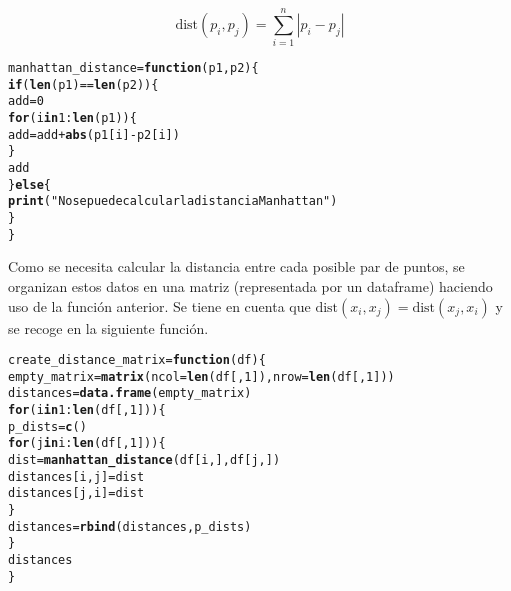 \documentclass[12pt]{report}\usepackage[]{graphicx}\usepackage[dvipsnames]{xcolor}
\makeatletter
\newcommand{\hlnum}[1]{\textcolor[rgb]{0.686,0.059,0.569}{#1}}%
\newcommand{\hlstr}[1]{\textcolor[rgb]{0.192,0.494,0.8}{#1}}%
\newcommand{\hlopt}[1]{\textcolor[rgb]{0,0,0}{#1}}%
\newcommand{\hlstd}[1]{\textcolor[rgb]{0.345,0.345,0.345}{#1}}%
\newcommand{\hlkwa}[1]{\textcolor[rgb]{0.161,0.373,0.58}{\textbf{#1}}}%
\newcommand{\hlkwb}[1]{\textcolor[rgb]{0.69,0.353,0.396}{#1}}%
\newcommand{\hlkwc}[1]{\textcolor[rgb]{0.333,0.667,0.333}{#1}}%
\newcommand{\hlkwd}[1]{\textcolor[rgb]{0.737,0.353,0.396}{\textbf{#1}}}%
\newenvironment{kframe}{%
 \def\at@end@of@kframe{}%
 \ifinner\ifhmode%
  \def\at@end@of@kframe{\end{minipage}}%
  \begin{minipage}{\columnwidth}%
 \fi\fi%
 \def\FrameCommand##1{\hskip\@totalleftmargin \hskip-\fboxsep
 \colorbox{shadecolor}{##1}\hskip-\fboxsep
     \hskip-\linewidth \hskip-\@totalleftmargin \hskip\columnwidth}%
 \MakeFramed {\advance\hsize-\width
   \@totalleftmargin\z@ \linewidth\hsize
   \@setminipage}}%
 {\par\unskip\endMakeFramed%
 \at@end@of@kframe}
\newenvironment{knitrout}{}{} %
\newcommand{\dt}{\text{dist}}
\makeatother
\begin{document}
						$$
						\dt(p_i, p_j) = \sum_{i=1}^n |p_i-p_j|
						$$
						
\begin{knitrout}
\color{fgcolor}\begin{kframe}
\begin{alltt}
\hlstd{manhattan_distance} \hlkwb{=} \hlkwa{function}\hlstd{(}\hlkwc{p1}\hlstd{,} \hlkwc{p2}\hlstd{) \{}
        \hlkwa{if}\hlstd{(}\hlkwd{len}\hlstd{(p1)} \hlopt{==} \hlkwd{len}\hlstd{(p2))\{}
                \hlstd{add} \hlkwb{=} \hlnum{0}
                \hlkwa{for}\hlstd{(i} \hlkwa{in} \hlnum{1}\hlopt{:}\hlkwd{len}\hlstd{(p1)) \{}
                        \hlstd{add} \hlkwb{=} \hlstd{add} \hlopt{+} \hlkwd{abs}\hlstd{(p1[i]} \hlopt{-} \hlstd{p2[i])}
                \hlstd{\}}
                \hlstd{add}
        \hlstd{\}} \hlkwa{else} \hlstd{\{}
                \hlkwd{print}\hlstd{(}\hlstr{"No se puede calcular la distancia Manhattan"}\hlstd{)}
        \hlstd{\}}
\hlstd{\}}
\end{alltt}
\end{kframe}
\end{knitrout}
						
						Como se necesita calcular la distancia entre cada posible par de puntos, se organizan estos datos en una matriz (representada por un dataframe) haciendo uso de la función anterior. Se tiene en cuenta que $\dt(x_i, x_j) = \dt(x_j, x_i)$ y se recoge en la siguiente función. 
						
\begin{knitrout}
\color{fgcolor}\begin{kframe}
\begin{alltt}
\hlstd{create_distance_matrix} \hlkwb{=} \hlkwa{function}\hlstd{(}\hlkwc{df}\hlstd{) \{}
        \hlstd{empty_matrix} \hlkwb{=} \hlkwd{matrix}\hlstd{(}\hlkwc{ncol} \hlstd{=} \hlkwd{len}\hlstd{(df[,}\hlnum{1}\hlstd{]),} \hlkwc{nrow} \hlstd{=} \hlkwd{len}\hlstd{(df[,}\hlnum{1}\hlstd{]))}
        \hlstd{distances} \hlkwb{=} \hlkwd{data.frame}\hlstd{(empty_matrix)}
        \hlkwa{for} \hlstd{(i} \hlkwa{in} \hlnum{1}\hlopt{:}\hlkwd{len}\hlstd{(df[,}\hlnum{1}\hlstd{])) \{}
                \hlstd{p_dists} \hlkwb{=} \hlkwd{c}\hlstd{()}
                \hlkwa{for} \hlstd{(j} \hlkwa{in} \hlstd{i}\hlopt{:}\hlkwd{len}\hlstd{(df[,}\hlnum{1}\hlstd{])) \{}
                        \hlstd{dist} \hlkwb{=} \hlkwd{manhattan_distance}\hlstd{(df[i,], df[j,])}
                        \hlstd{distances[i,j]} \hlkwb{=} \hlstd{dist}
                        \hlstd{distances[j,i]} \hlkwb{=} \hlstd{dist}
                \hlstd{\}}
                \hlstd{distances} \hlkwb{=} \hlkwd{rbind}\hlstd{(distances, p_dists)}
        \hlstd{\}}
        \hlstd{distances}
\hlstd{\}}
\end{alltt}
\end{kframe}
\end{knitrout}
						
\end{document}
